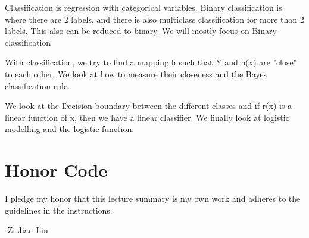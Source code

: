 \documentclass[twoside]{article}
\theoremstyle{definition}
\theoremstyle{definition}
\theoremstyle{remark}
\begin{document}
	Classification is regression with categorical variables. Binary classification is where there are 2 labels, and there is also multiclass classification for more than 2 labels. This also can be reduced to binary. We will mostly focus on Binary classification
	
	With classification, we try to find a mapping h such that Y and h(x) are "close" to each other. We look at how to measure their closeness and the Bayes classification rule.
	
	We look at the Decision boundary between the different classes and if r(x) is a linear function of x, then we have a linear classifier. We finally look at logistic modelling and the logistic function.
	
	
	
	
	\section*{Honor Code}
	
	I pledge my honor that this lecture summary is my own work and adheres to the guidelines in the instructions.
	
	-Zi Jian Liu
\end{document}
